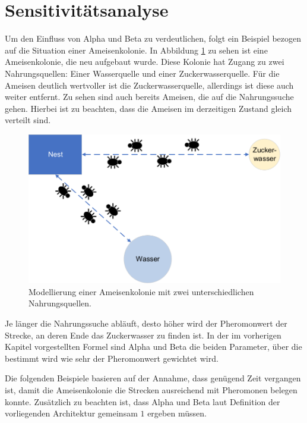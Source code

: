 \section{Sensitivitätsanalyse}{
	Um den Einfluss von Alpha und Beta zu verdeutlichen, folgt ein Beispiel bezogen auf die Situation einer Ameisenkolonie. In Abbildung \ref{parameter_start} zu sehen ist eine Ameisenkolonie, die neu aufgebaut wurde. Diese Kolonie hat Zugang zu zwei Nahrungsquellen: Einer Wasserquelle und einer Zuckerwasserquelle. Für die Ameisen deutlich wertvoller ist die Zuckerwasserquelle, allerdings ist diese auch weiter entfernt. Zu sehen sind auch bereits Ameisen, die auf die Nahrungssuche gehen. Hierbei ist zu beachten, dass die Ameisen im derzeitigen Zustand gleich verteilt sind.
	\begin{figure}[h]
		\centering
		\includegraphics[width=0.9\linewidth]{images/AntAlgorithm_start.png}
		\caption{Modellierung einer Ameisenkolonie mit zwei unterschiedlichen Nahrungsquellen.}
		\label{parameter_start}
	\end{figure}
	Je länger die Nahrungssuche abläuft, desto höher wird der Pheromonwert der Strecke, an deren Ende das Zuckerwasser zu finden ist. In der im vorherigen Kapitel vorgestellten Formel sind Alpha und Beta die beiden Parameter, über die bestimmt wird wie sehr der Pheromonwert gewichtet wird. 
	
	Die folgenden Beispiele basieren auf der Annahme, dass genügend Zeit vergangen ist, damit die Ameisenkolonie die Strecken ausreichend mit Pheromonen belegen konnte.
	Zusätzlich zu beachten ist, dass Alpha und Beta laut Definition der vorliegenden Architektur gemeinsam $1$ ergeben müssen.
	
}
